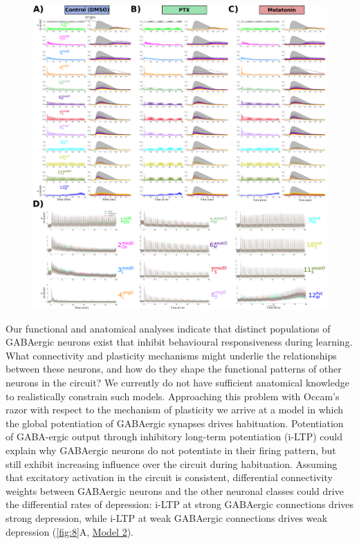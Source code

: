 \documentclass[9pt,lineno]{RandlettLab_elife}
\begin{document}
\begin{figure}
\begin{fullwidth}
\begin{center}
{}{\includegraphics[width=14cm]{FigureS3_DrugsMeanVectors.png}}
\label{fig:S8}
\end{center}
\end{fullwidth}
\end{figure}


Our functional and anatomical analyses indicate that distinct populations of GABAergic neurons exist that inhibit behavioural responsiveness during learning. What connectivity and plasticity mechanisms might underlie the relationships between these neurons, and how do they shape the functional patterns of other neurons in the circuit? We currently do not have sufficient anatomical knowledge to realistically constrain such models. Approaching this problem with Occam's razor with respect to the mechanism of plasticity we arrive at a model in which the global potentiation of GABAergic synapses drives habituation. Potentiation of GABA-ergic output through inhibitory long-term potentiation (i-LTP) could explain why GABAergic neurons do not potentiate in their firing pattern, but still exhibit increasing influence over the circuit during habituation. Assuming that excitatory activation in the circuit is consistent, differential connectivity weights between GABAergic neurons and the other neuronal classes could drive the differential rates of depression: i-LTP at strong GABAergic connections drives strong depression, while i-LTP at weak GABAergic connections drives weak depression (\autoref{fig:8}A, \underline{Model 2}). 
\end{document}
